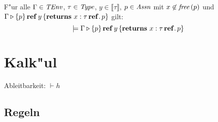 \documentclass[12pt,a4paper,bigheadings]{scrartcl}
\newcommand{\semantic}[1]{\ensuremath{\llbracket#1\rrbracket}}
\newcommand{\TEnv}{\name{TEnv}}
\newcommand{\Assn}{\name{Assn}}
\begin{document}
\begin{lemma}
  F"ur alle $\Gamma\in\TEnv$, $\tau\in{\text{\it Type\/}}$, $y\in\semantic{\tau}$, $p \in\Assn$ mit
  $x \not \in {\text{\it free\/}}\,(p)$ und $\Gamma \triangleright \{p\}\,\mathbf{ref}\,y\,\{{\bf returns}\ x:\tau\,\mathbf{ref}.\, p\}$ gilt:
  \[
    \models \Gamma \triangleright \{p\}\,\mathbf{ref}\,y\,\{{\bf returns}\ x:\tau\,\mathbf{ref}.\, p\}
  \]
\end{lemma}



\section{Kalk"ul}

Ableitbarkeit: $\vdash h$

\subsection{Regeln}
\end{document}
